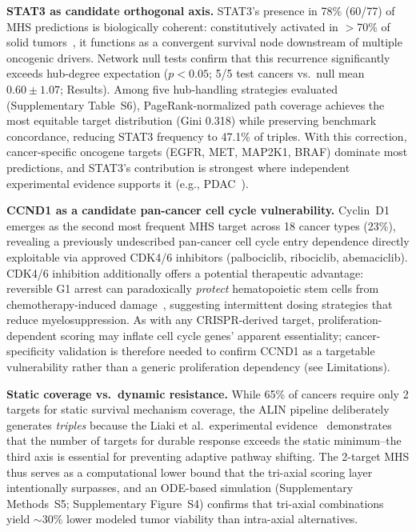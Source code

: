 \documentclass[11pt]{article}
\begin{document}
\textbf{STAT3 as candidate orthogonal axis.} STAT3's presence in 78\% (60/77) of MHS predictions is biologically coherent: constitutively activated in $>$70\% of solid tumors~\cite{Yu2004,Frank2007}, it functions as a convergent survival node downstream of multiple oncogenic drivers. Network null tests confirm that this recurrence significantly exceeds hub-degree expectation ($p < 0.05$; 5/5 test cancers vs.\ null mean $0.60 \pm 1.07$; Results). Among five hub-handling strategies evaluated (Supplementary Table~S6), PageRank-normalized path coverage achieves the most equitable target distribution (Gini 0.318) while preserving benchmark concordance, reducing STAT3 frequency to 47.1\% of triples. With this correction, cancer-specific oncogene targets (EGFR, MET, MAP2K1, BRAF) dominate most predictions, and STAT3's contribution is strongest where independent experimental evidence supports it (e.g., PDAC~\cite{Liaki2025}).

\textbf{CCND1 as a candidate pan-cancer cell cycle vulnerability.} Cyclin~D1 emerges as the second most frequent MHS target across 18 cancer types (23\%), revealing a previously undescribed pan-cancer cell cycle entry dependence directly exploitable via approved CDK4/6 inhibitors (palbociclib, ribociclib, abemaciclib). CDK4/6 inhibition additionally offers a potential therapeutic advantage: reversible G1 arrest can paradoxically \emph{protect} hematopoietic stem cells from chemotherapy-induced damage~\cite{Roberts2012}, suggesting intermittent dosing strategies that reduce myelosuppression. As with any CRISPR-derived target, proliferation-dependent scoring may inflate cell cycle genes' apparent essentiality; cancer-specificity validation is therefore needed to confirm CCND1 as a targetable vulnerability rather than a generic proliferation dependency (see Limitations).

\textbf{Static coverage vs.\ dynamic resistance.} While 65\% of cancers require only 2 targets for static survival mechanism coverage, the ALIN pipeline deliberately generates \emph{triples} because the Liaki et al.\ experimental evidence~\cite{Liaki2025} demonstrates that the number of targets for durable response exceeds the static minimum--the third axis is essential for preventing adaptive pathway shifting. The 2-target MHS thus serves as a computational lower bound that the tri-axial scoring layer intentionally surpasses, and an ODE-based simulation (Supplementary Methods~S5; Supplementary Figure~S4) confirms that tri-axial combinations yield $\sim$30\% lower modeled tumor viability than intra-axial alternatives.
\end{document}
